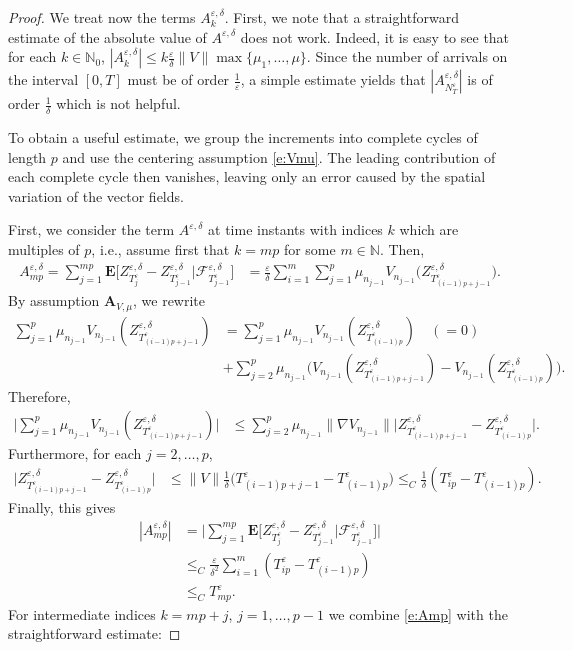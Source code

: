 \documentclass[10pt]{article}
\newcommand{\E}{\mathbf{E}}
\newcommand{\1}{1\!\!\!\;{\rm I}}
\theoremstyle{plain}
\theoremstyle{definition}
\newcommand{\e}{\varepsilon}
\newcommand{\ba}{\begin{equation}\begin{aligned}}
\newcommand{\ea}{\end{aligned}\end{equation}}
\newcommand{\rF}{\mathscr{F}}
\numberwithin{equation}{section}
\begin{document}
\begin{proof}
We treat now the terms $A_k^{\e,\delta}$.
First, we note that a straightforward estimate of the absolute value of $A^{\e,\delta}$ does not work.
Indeed, it is easy to see that for
each $k\in\mathbb N_0$,
$|A^{\e,\delta}_k|\leq k\frac{\e}{\delta}\|V\|\max\{\mu_1,\dots,\mu\} $. Since the number of arrivals on the interval $[0,T]$
must be of order $\frac{1}{\e}$, a simple estimate yields that $|A^{\e,\delta}_{N^\e_T}|$ is of order $\frac{1}{\delta}$
which is not helpful.

To obtain a useful estimate, we group the increments into complete cycles of length $p$ and use the centering assumption
\eqref{e:Vmu}. The leading contribution of each complete cycle then vanishes, leaving only an error caused by
the spatial variation of the vector fields.

First, we consider the term $A^{\e,\delta}$ at time instants with indices $k$ which are multiples of $p$, i.e., assume first that
$k=mp$ for some $m\in\mathbb N$.
Then,
\ba
A_{mp}^{\e,\delta}
=\sum_{j=1}^{mp}
\E \Big[ Z^{\e,\delta}_{T^\e_j}- Z^{\e,\delta}_{T^\e_{j-1}}\Big|\rF^{\e,\delta}_{T^\e_{j-1}}  \Big]
&=\frac{\e }{\delta}\sum_{i=1}^{m} \sum_{j=1}^{p}
\mu_{n_{j-1}}V_{n_{j-1}}\Big(Z^{\e,\delta}_{T^\e_{(i-1)p+j-1}} \Big).
\ea
By assumption $\mathbf{A}_{V,\mu}$, we rewrite
\ba
\sum_{j=1}^{p}
\mu_{n_{j-1}}V_{n_{j-1}}(Z^{\e,\delta}_{T^\e_{(i-1)p+j-1}} )
&=
\sum_{j=1}^{p} \mu_{n_{j-1}}V_{n_{j-1}} (Z^{\e,\delta}_{T^\e_{(i-1)p}} )\quad (=0)\\
&+ \sum_{j=2}^{p}
\mu_{n_{j-1}} \Big(V_{n_{j-1}}(Z^{\e,\delta}_{T^\e_{(i-1)p+j-1}} ) - V_{n_{j-1}}(  Z^{\e,\delta}_{T^\e_{(i-1)p}})\Big).
\ea
Therefore,
\ba
\Big|\sum_{j=1}^{p}
\mu_{n_{j-1}} V_{n_{j-1}}(Z^{\e,\delta}_{T^\e_{(i-1)p+j-1}} )\Big|
&\leq\sum_{j=2}^{p} \mu_{n_{j-1}} \|\nabla V_{n_{j-1}}\|
\Big|Z^{\e,\delta}_{T^\e_{(i-1)p+j-1}} - Z^{\e,\delta}_{T^\e_{(i-1)p}}\Big| .
\ea
Furthermore, for each $j=2,\dots, p$,
\ba
\Big|Z^{\e,\delta}_{T^\e_{(i-1)p+j-1}} - Z^{\e,\delta}_{T^\e_{(i-1)p}}\Big|
&\leq  \| V\|
\frac{1}{\delta} \Big(T^\e_{(i-1)p+j-1} - T^\e_{(i-1)p}\Big)
\leq_C  \frac{1}{\delta} (T^\e_{ip} - T^\e_{(i-1)p}).
\ea
Finally, this gives
\ba
\label{e:Amp}
|A_{mp}^{\e,\delta}|&=\Big|\sum_{j=1}^{mp}
\E \Big[ Z^{\e,\delta}_{T^\e_j}- Z^{\e,\delta}_{T^\e_{j-1}}\Big|\rF^{\e,\delta}_{T^\e_{j-1}}  \Big]\Big|\\
&\leq_C \frac{\e}{\delta^2} \sum_{i=1}^{m} (T^\e_{ip} - T^\e_{(i-1)p})\\
&\leq_C  T_{mp}^\e.
\ea
For intermediate
indices $k=mp + j$, $j=1,\dots,p-1$ we combine \eqref{e:Amp} with the straightforward estimate:

\end{proof}
\end{document}
